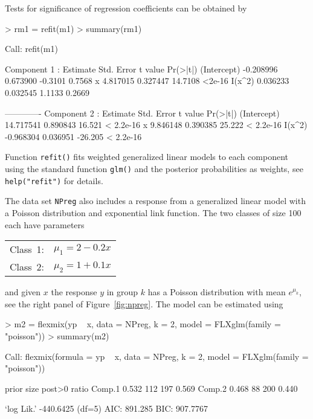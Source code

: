 \documentclass{jss}
\newcommand{\R}{\proglang{R}}
\begin{document}
Tests for significance of regression coefficients can be obtained by
\begin{Schunk}
\begin{Sinput}
> rm1 = refit(m1)
> summary(rm1)
\end{Sinput}
\begin{Soutput}
Call:
refit(m1)

Component 1 :
             Estimate Std. Error t value Pr(>|t|)
(Intercept) -0.208996   0.673900 -0.3101   0.7568
x            4.817015   0.327447 14.7108   <2e-16
I(x^2)       0.036233   0.032545  1.1133   0.2669

-------------
Component 2 :
             Estimate Std. Error t value  Pr(>|t|)
(Intercept) 14.717541   0.890843  16.521 < 2.2e-16
x            9.846148   0.390385  25.222 < 2.2e-16
I(x^2)      -0.968304   0.036951 -26.205 < 2.2e-16
\end{Soutput}
\end{Schunk}
Function \texttt{refit()} fits weighted generalized linear models to each
component using the standard \R{} function \texttt{glm()} and the
posterior probabilities as weights, see \texttt{help("refit")} for
details.

The data set \texttt{NPreg} also includes a response from a
generalized linear model with a Poisson distribution and exponential
link function. The two classes of size 100 each have
parameters
\begin{center}
  \begin{tabular}{ll}
    Class~1: & $ \mu_1 = 2 - 0.2x$\\
    Class~2: & $ \mu_2 = 1 + 0.1x$\\
  \end{tabular}
\end{center}
and given $x$ the response $y$ in group $k$ has a Poisson distribution
with mean $e^{\mu_k}$, see the right panel of Figure~\ref{fig:npreg}.
The model can be estimated using

\begin{Schunk}
\begin{Sinput}
> m2 = flexmix(yp ~ x, data = NPreg, k = 2, model = FLXglm(family = "poisson"))
> summary(m2)
\end{Sinput}
\begin{Soutput}
Call:
flexmix(formula = yp ~ x, data = NPreg, k = 2, model = FLXglm(family = "poisson"))

       prior size post>0 ratio
Comp.1 0.532  112    197 0.569
Comp.2 0.468   88    200 0.440

`log Lik.' -440.6425 (df=5)
AIC: 891.285   BIC: 907.7767 
\end{Soutput}
\end{Schunk}
\end{document}
